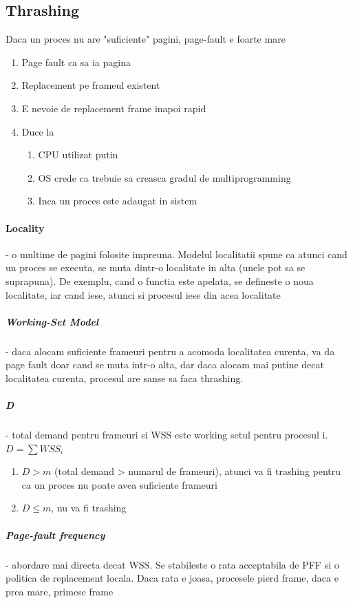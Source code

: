\documentclass{article}
\begin{document}
\subsection*{Thrashing}
Daca un proces nu are "suficiente" pagini, page-fault e foarte mare
\begin{enumerate}
    \item Page fault ca sa ia pagina
    \item Replacement pe frameul existent
    \item E nevoie de replacement frame inapoi rapid
    \item Duce la
          \begin{enumerate}
              \item CPU utilizat putin
              \item OS crede ca trebuie sa creasca gradul de multiprogramming
              \item Inca un proces este adaugat in sistem
          \end{enumerate}
\end{enumerate}

\paragraph*{Locality} - o multime de pagini folosite impreuna. Modelul localitatii spune ca atunci cand un proces se executa, se muta dintr-o localitate in alta (unele pot sa se suprapuna). De exemplu, cand o functia este apelata, se defineste o noua localitate, iar cand iese, atunci si procesul iese din acea localitate

\subparagraph*{Working-Set Model} - daca alocam suficiente frameuri pentru a acomoda localitatea curenta, va da page fault doar cand se muta intr-o alta, dar daca alocam mai putine decat localitatea curenta, procesul are sanse sa faca thrashing.
\subparagraph*{D} - total demand pentru frameuri si WSS este working setul pentru procesul i. $D=\sum WSS_i$
\begin{enumerate}
    \item $D>m$ (total demand > numarul de frameuri), atunci va fi trashing pentru ca un proces nu poate avea suficiente frameuri
    \item $D\leq m$, nu va fi trashing
\end{enumerate}

\subparagraph*{Page-fault frequency} - abordare mai directa decat WSS. Se stabileste o rata acceptabila de PFF si o politica de replacement locala. Daca rata e joasa, procesele pierd frame, daca e prea mare, primesc frame
\end{document}
